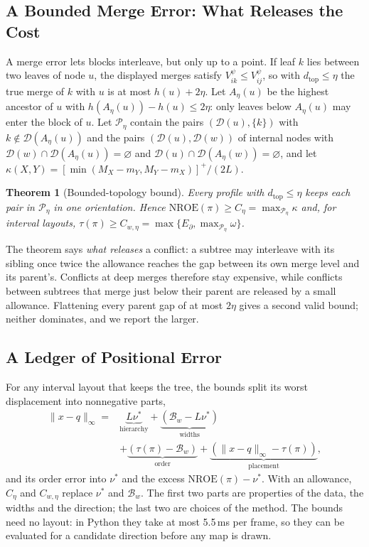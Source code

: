 \documentclass[review]{vgtc}
\newtheorem{theorem}{Theorem}
\newcommand{\dtop}{d_{\mathrm{top}}}
\newcommand{\nroe}{\mathrm{NROE}}
\begin{document}
\subsection{A Bounded Merge Error: What Releases the Cost}
A merge error lets blocks interleave, but only up to a point. If leaf $k$ lies between two leaves of node $u$, the displayed merges satisfy $V^\psi_{ik}\le V^\psi_{ij}$, so with $\dtop\le\eta$ the true merge of $k$ with $u$ is at most $h(u)+2\eta$. Let $A_\eta(u)$ be the highest ancestor of $u$ with $h(A_\eta(u))-h(u)\le2\eta$: only leaves below $A_\eta(u)$ may enter the block of $u$. Let $\mathcal{P}_\eta$ contain the pairs $(\mathcal{D}(u),\{k\})$ with $k\notin\mathcal{D}(A_\eta(u))$ and the pairs $(\mathcal{D}(u),\mathcal{D}(w))$ of internal nodes with $\mathcal{D}(w)\cap\mathcal{D}(A_\eta(u))=\varnothing$ and $\mathcal{D}(u)\cap\mathcal{D}(A_\eta(w))=\varnothing$, and let $\kappa(X,Y)=[\min(M_X-m_Y,M_Y-m_X)]^+/(2L)$.
\begin{theorem}[Bounded-topology bound]\label{thm:chain}
Every profile with $\dtop\le\eta$ keeps each pair in $\mathcal{P}_\eta$ in one orientation. Hence $\nroe(\pi)\ge C_\eta=\max_{\mathcal{P}_\eta}\kappa$ and, for interval layouts, $\tau(\pi)\ge C_{w,\eta}=\max\{E_\partial,\max_{\mathcal{P}_\eta}\omega\}$.
\end{theorem}
The theorem says \emph{what releases} a conflict: a subtree may interleave with its sibling once twice the allowance reaches the gap between its own merge level and its parent's. Conflicts at deep merges therefore stay expensive, while conflicts between subtrees that merge just below their parent are released by a small allowance. Flattening every parent gap of at most $2\eta$ gives a second valid bound; neither dominates, and we report the larger.

\subsection{A Ledger of Positional Error}
For any interval layout that keeps the tree, the bounds split its worst displacement into nonnegative parts,
\begin{equation}\label{eq:ledger}
\begin{split}
\|x-q\|_\infty={}&\underbrace{L\nu^*}_{\text{hierarchy}}+\underbrace{(\mathcal{B}_w-L\nu^*)}_{\text{widths}}\\
&+\underbrace{(\tau(\pi)-\mathcal{B}_w)}_{\text{order}}+\underbrace{(\|x-q\|_\infty-\tau(\pi))}_{\text{placement}},
\end{split}
\end{equation}
and its order error into $\nu^*$ and the excess $\nroe(\pi)-\nu^*$. With an allowance, $C_\eta$ and $C_{w,\eta}$ replace $\nu^*$ and $\mathcal{B}_w$. The first two parts are properties of the data, the widths and the direction; the last two are choices of the method. The bounds need no layout: in Python they take at most 5.5\,ms per frame, so they can be evaluated for a candidate direction before any map is drawn.
\end{document}
